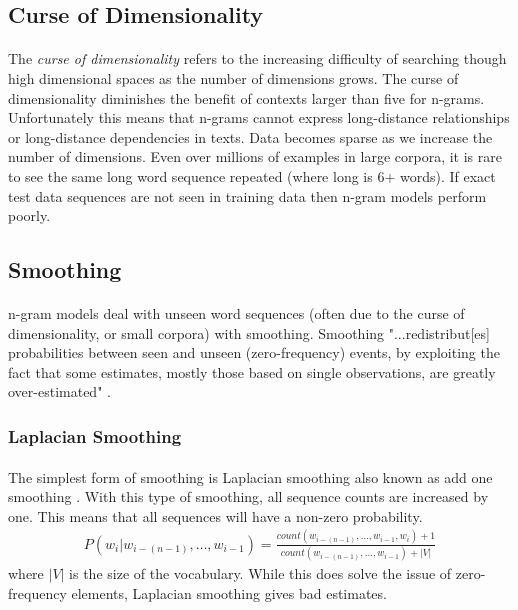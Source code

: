 \subsection{Curse of Dimensionality}
\paragraph{}
The \emph{curse of dimensionality} refers to the increasing difficulty of searching though high dimensional spaces as the number of dimensions grows. The curse of dimensionality diminishes the benefit of contexts larger than five for n-grams. Unfortunately this means that n-grams cannot express long-distance relationships or long-distance dependencies in texts. Data becomes sparse as we increase the number of dimensions. Even over millions of examples in large corpora, it is rare to see the same long word sequence repeated (where long is 6+ words). If exact test data sequences are not seen in training data then n-gram models perform poorly.
\subsection{Smoothing}
\paragraph{}
n-gram models deal with unseen word sequences (often due to the curse of dimensionality, or small corpora) with smoothing. Smoothing "...redistribut[es] probabilities between seen and unseen (zero-frequency) events, by
exploiting the fact that some estimates, mostly those based on single observations, are greatly over-estimated" \cite[pg. 16]{Mikolov2012}.
\subsubsection{Laplacian Smoothing}
\paragraph{}
The simplest form of smoothing is Laplacian smoothing also known as add one smoothing \cite{Jurafsky2009}. With this type of smoothing, all sequence counts are increased by one. This means that all sequences will have a non-zero probability. 
\begin{align}
P(w_i | w_{i-(n-1)},\dots, w_{i-1}) = \frac{count(w_{i-(n-1)},\dots,w_{i-1},w_i)+1}{count(w_{i-(n-1)},\dots,w_{i-1})+|V|}
\end{align}
where $|V|$ is the size of the vocabulary. While this does solve the issue of zero-frequency elements, Laplacian smoothing gives bad estimates. 
